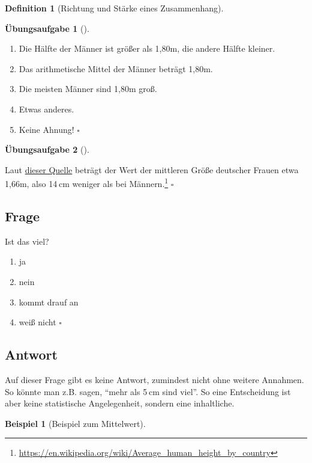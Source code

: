 \documentclass[
  a4paper,
  DIV=11]{scrreprt}
\providecommand{\tightlist}{%
  \setlength{\itemsep}{0pt}\setlength{\parskip}{0pt}}\usepackage{longtable,booktabs,array}
\theoremstyle{definition}
\newtheorem{exercise}{Übungsaufgabe}[chapter]
\theoremstyle{definition}
\newtheorem{example}{Beispiel}[chapter]
\theoremstyle{definition}
\newtheorem{definition}{Definition}[chapter]
\theoremstyle{remark}
\begin{document}
\begin{definition}[Richtung und Stärke eines
Zusammenhang]
\begin{exercise}[]
\begin{enumerate}
\def\labelenumi{\alph{enumi})}
\tightlist
\item
  Die Hälfte der Männer ist größer als 1,80m, die andere Hälfte kleiner.
\item
  Das arithmetische Mittel der Männer beträgt 1,80m.
\item
  Die meisten Männer sind 1,80m groß.
\item
  Etwas anderes.
\item
  Keine Ahnung! \(\square\)
\end{enumerate}

\end{exercise}

\begin{exercise}[]\protect\hypertarget{exr-mw2}{}\label{exr-mw2}

Laut
\href{https://en.wikipedia.org/wiki/Average_human_height_by_country}{dieser
Quelle} beträgt der Wert der mittleren Größe deutscher Frauen etwa
1,66m, also 14 cm weniger als bei Männern.\footnote{\url{https://en.wikipedia.org/wiki/Average_human_height_by_country}}
\(\square\)

\end{exercise}

\subsection{Frage}

Ist das viel?

\begin{enumerate}
\def\labelenumi{\alph{enumi})}
\tightlist
\item
  ja
\item
  nein
\item
  kommt drauf an
\item
  weiß nicht \(\square\)
\end{enumerate}

\subsection{Antwort}

Auf dieser Frage gibt es keine Antwort, zumindest nicht ohne weitere
Annahmen. So könnte man z.B. sagen, ``mehr als 5 cm sind viel''. So eine
Entscheidung ist aber keine statistische Angelegenheit, sondern eine
inhaltliche.

\begin{example}[Beispiel zum
Mittelwert]\protect\hypertarget{exm-mw}{}\label{exm-mw}


\end{example}
\end{definition}
\end{document}
